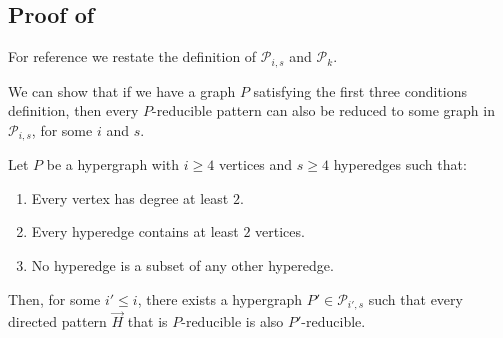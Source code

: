 \documentclass[a4paper,UKenglish,cleveref, autoref, numberwithinsect, thm-restate]{lipics-v2021}
\newcommand{\reducible}[1]{${#1}$-reducible}
\begin{document}
	\subsection{Proof of }
	
	For reference we restate the definition of $\mathcal{P}_{i,s}$ and $\mathcal{P}_k$.
	
	\calp*
	
	We can show that if we have a graph $P$ satisfying the first three conditions definition, then every \reducible{P} pattern can also be reduced to some graph in $\mathcal{P}_{i,s}$, for some $i$ and $s$.
	
	\begin{lemma} \label{lem:simplify}
		Let $P$ be a hypergraph with $i\geq4$ vertices and $s \geq 4$ hyperedges such that:
		\begin{enumerate}
			\item Every vertex has degree at least $2$.
			\item Every hyperedge contains at least $2$ vertices.
			\item No hyperedge is a subset of any other hyperedge.
		\end{enumerate}
		Then, for some $i' \leq i$, there exists a hypergraph $P' \in \mathcal{P}_{i',s}$ such that every directed pattern $\vec{H}$ that is \reducible{P} is also \reducible{P'}.
	\end{lemma}
\end{document}
